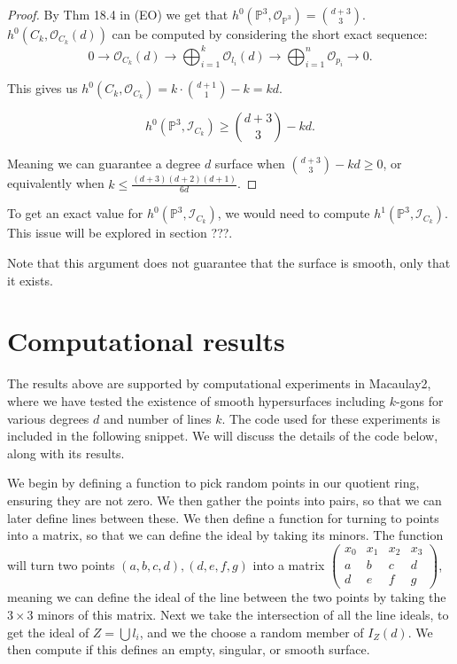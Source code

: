 \begin{proof}
    By Thm 18.4 in (EO) we get that $h^0(\mathbb{P}^3, \mathcal{O}_{\mathbb{P}^3}) = \binom{d+3}{3}$. $h^0(C_k, \mathcal{O}_{C_k}(d))$ can be computed by considering the short exact sequence: 
    \[
    0 \to \mathcal{O}_{C_k}(d) \to \bigoplus_{i=1}^k \mathcal{O}_{l_i}(d) \to \bigoplus_{i=1}^n \mathcal{O}_{p_i} \to 0.
    \]

    This gives us $h^0(C_k, \mathcal{O}_{C_k}) = k \cdot \binom{d+1}{1} - k = kd$.

    \[
    h^0(\mathbb{P}^3, \mathcal{I}_{C_k}) \geq \binom{d+3}{3} - kd.
    \]

    Meaning we can guarantee a degree $d$ surface when $\binom{d+3}{3} - kd \geq 0$, or equivalently when $k \leq \frac{(d+3)(d+2)(d+1)}{6d}$.

\end{proof}

To get an exact value for $h^0(\mathbb{P}^3, \mathcal{I}_{C_k})$, we would need to compute $h^1(\mathbb{P}^3, \mathcal{I}_{C_k})$. This issue will be explored in section ???. 


\begin{remark}
    Note that this argument does not guarantee that the surface is smooth, only that it exists.
\end{remark}

\section{Computational results}

The results above are supported by computational experiments in Macaulay2, where we have tested the existence of smooth hypersurfaces including $k$-gons for various degrees $d$ and number of lines $k$. The code used for these experiments is included in the following snippet. We will discuss the details of the code below, along with its results.



We begin by defining a function to pick random points in our quotient ring, ensuring they are not zero. We then gather the points into pairs, so that we can later define lines between these. We then define a function for turning to points into a matrix, so that we can define the ideal by taking its minors. The function will turn two points $(a,b,c,d), (d,e,f,g)$ into a matrix $\begin{pmatrix}
    x_0 & x_1 & x_2 & x_3 \\
    a & b & c & d \\
    d & e & f & g 
\end{pmatrix}$, meaning we can define the ideal of the line between the two points by taking the $3 \times 3$ minors of this matrix. Next we take the intersection of all the line ideals, to get the ideal of $Z = \bigcup l_i$, and we the choose a random member of $I_Z(d)$. We then compute if this defines an empty, singular, or smooth surface. \\

